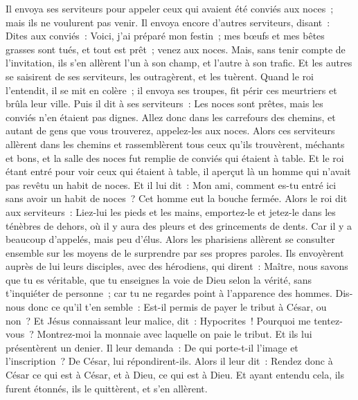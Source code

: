 \begin{multicols}{2}
Il envoya ses serviteurs pour appeler ceux qui avaient été conviés aux noces~; mais ils ne voulurent pas venir.
Il envoya encore d'autres serviteurs, disant~: Dites aux conviés~: Voici, j'ai préparé mon festin~; mes bœufs et mes bêtes grasses sont tués, et tout est prêt~; venez aux noces.
Mais, sans tenir compte de l'invitation, ils s'en allèrent l'un à son champ, et l'autre à son trafic.
Et les autres se saisirent de ses serviteurs, les outragèrent, et les tuèrent.
Quand le roi l'entendit, il se mit en colère~; il envoya ses troupes, fit périr ces meurtriers et brûla leur ville.
Puis il dit à ses serviteurs~: Les noces sont prêtes, mais les conviés n'en étaient pas dignes.
Allez donc dans les carrefours des chemins, et autant de gens que vous trouverez, appelez-les aux noces.
Alors ces serviteurs allèrent dans les chemins et rassemblèrent tous ceux qu'ils trouvèrent, méchants et bons, et la salle des noces fut remplie de conviés qui étaient à table.
Et le roi étant entré pour voir ceux qui étaient à table, il aperçut là un homme qui n'avait pas revêtu un habit de noces.
Et il lui dit~: Mon ami, comment es-tu entré ici sans avoir un habit de noces~? Cet homme eut la bouche fermée.
Alors le roi dit aux serviteurs~: Liez-lui les pieds et les mains, emportez-le et jetez-le dans les ténèbres de dehors, où il y aura des pleurs et des grincements de dents.
Car il y a beaucoup d'appelés, mais peu d'élus.
Alors les pharisiens allèrent se consulter ensemble sur les moyens de le surprendre par ses propres paroles.
Ils envoyèrent auprès de lui leurs disciples, avec des hérodiens, qui dirent~: Maître, nous savons que tu es véritable, que tu enseignes la voie de Dieu selon la vérité, sans t'inquiéter de personne~; car tu ne regardes point à l'apparence des hommes.
Dis-nous donc ce qu'il t'en semble~: Est-il permis de payer le tribut à César, ou non~?
Et Jésus connaissant leur malice, dit~: Hypocrites~! Pourquoi me tentez-vous~?
Montrez-moi la monnaie avec laquelle on paie le tribut. Et ils lui présentèrent un denier.
Il leur demanda~: De qui porte-t-il l'image et l'inscription~?
De César, lui répondirent-ils. Alors il leur dit~: Rendez donc à César ce qui est à César, et à Dieu, ce qui est à Dieu.
Et ayant entendu cela, ils furent étonnés, ils le quittèrent, et s'en allèrent.

\end{multicols}
